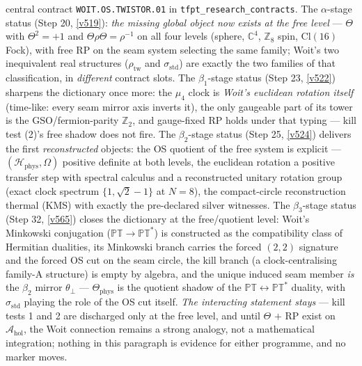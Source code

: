 \documentclass[11pt,a4paper]{article}
\newcommand{\Z}{\mathbb{Z}}
\theoremstyle{definition}
\begin{document}
central contract \texttt{WOIT.OS.TWISTOR.01} in \texttt{tfpt\_research\_contracts}. The
$\alpha$-stage status (Step 20, \vref{v519}): \emph{the missing global object now exists at the
free level} --- $\Theta$ with $\Theta^2=+1$ and $\Theta\rho\Theta=\rho^{-1}$ on all four levels
(sphere, $\mathbb C^4$, $\Z_8$ spin, $\mathrm{Cl}(16)$ Fock), with free RP on the seam system selecting
the same family; Woit's two inequivalent real structures ($\rho_{\mathrm{tw}}$ and
$\sigma_{\mathrm{std}}$) are exactly the two families of that classification, in \emph{different}
contract slots. The $\beta_1$-stage status (Step 23, \vref{v522}) sharpens the dictionary once
more: the $\mu_4$ clock is \emph{Woit's euclidean rotation itself} (time-like: every seam mirror
axis inverts it), the only gaugeable part of its tower is the GSO/fermion-parity $\Z_2$, and
gauge-fixed RP holds under that typing --- kill test (2)'s free shadow does not fire.
The $\beta_2$-stage status (Step 25, \vref{v524}) delivers the first \emph{reconstructed}
objects: the OS quotient of the free system is explicit ---
$(\mathcal H_{\mathrm{phys}}, \Omega)$ positive definite at both levels, the euclidean
rotation a positive transfer step with spectral calculus and a reconstructed unitary rotation
group (exact clock spectrum $\{1, \sqrt2-1\}$ at $N = 8$), the compact-circle reconstruction
thermal (KMS) with exactly the pre-declared silver witnesses.
The $\beta_3$-stage status (Step 32, \vref{v565}) closes the dictionary at the free/quotient
level: Woit's Minkowski conjugation ($\mathbb{PT}\to\mathbb{PT}^*$) is constructed as the
compatibility class of Hermitian dualities, its Minkowski branch carries the forced $(2,2)$
signature and the forced OS cut on the seam circle, the kill branch (a clock-centralising
family-A structure) is empty by algebra, and the unique induced seam member \emph{is} the
$\beta_2$ mirror $\theta_\perp$ --- $\Theta_{\mathrm{phys}}$ is the quotient shadow of the
$\mathbb{PT}\leftrightarrow\mathbb{PT}^*$ duality, with $\sigma_{\mathrm{std}}$ playing the
role of the OS cut itself.
\emph{The interacting statement stays \mO} --- kill tests 1 and 2 are discharged only at
the free level, and until $\Theta$ $+$ RP exist on $\mathcal A_{\mathrm{hol}}$, the Woit
connection remains a strong analogy, not a mathematical integration; nothing in this paragraph is
evidence for either programme, and no marker moves.

\end{document}
